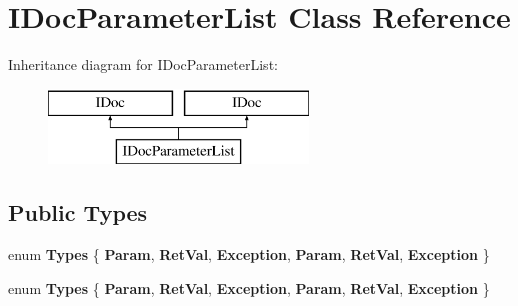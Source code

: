 \hypertarget{class_i_doc_parameter_list}{}\section{I\+Doc\+Parameter\+List Class Reference}
\label{class_i_doc_parameter_list}
Inheritance diagram for I\+Doc\+Parameter\+List\+:\begin{figure}[H]
\begin{center}
\leavevmode
\includegraphics[height=2.000000cm]{class_i_doc_parameter_list}
\end{center}
\end{figure}
\subsection*{Public Types}
\begin{DoxyCompactItemize}
\item 
\mbox{\label{class_i_doc_parameter_list_ad421a101c61e0e39266d2fde4ce5acc0}} 
enum {\bfseries Types} \{ \newline
{\bfseries Param}, 
{\bfseries Ret\+Val}, 
{\bfseries Exception}, 
{\bfseries Param}, 
\newline
{\bfseries Ret\+Val}, 
{\bfseries Exception}
 \}
\item 
\mbox{\label{class_i_doc_parameter_list_ad421a101c61e0e39266d2fde4ce5acc0}} 
enum {\bfseries Types} \{ \newline
{\bfseries Param}, 
{\bfseries Ret\+Val}, 
{\bfseries Exception}, 
{\bfseries Param}, 
\newline
{\bfseries Ret\+Val}, 
{\bfseries Exception}
 \}
\end{DoxyCompactItemize}
